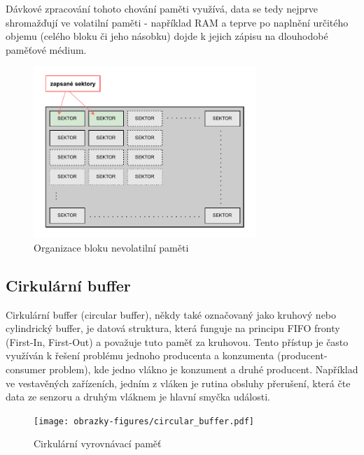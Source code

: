 Dávkové zpracování tohoto chování paměti využívá, data se tedy nejprve shromažďují ve volatilní paměti - například RAM a teprve po naplnění určitého objemu (celého bloku či jeho násobku) dojde k jejich zápisu na dlouhodobé paměťové médium.

\begin{figure}[h]
    \centering
    \includegraphics[width=0.75\textwidth]{obrazky-figures/batch_processing.pdf}
    
    \caption{Organizace bloku nevolatilní paměti \cite{ieee_relationships_among_region_segment_frame_and_cluster}}
    \label{fig:batch-processing}
\end{figure}

\newpage

\subsection{Cirkulární buffer}
\label{cirkularni_buffer}
Cirkulární buffer (circular buffer), někdy také označovaný jako kruhový nebo cylindrický buffer, je datová struktura, která funguje na principu FIFO fronty (First-In, First-Out) a považuje tuto paměť za kruhovou. Tento přístup je často využíván k řešení problému jednoho producenta a konzumenta (producent-consumer problem), kde jedno vlákno je konzument a druhé producent. Například ve vestavěných zařízeních, jedním z vláken je rutina obsluhy přerušení, která čte data ze senzoru a druhým vláknem je hlavní smyčka události. \cite{embedjournal_ring_buffer}


\begin{figure}[h]
    \centering
    \texttt{[image: obrazky-figures/circular\_buffer.pdf]}
    
    \caption{Cirkulární vyrovnávací paměť}
    \label{fig:circular-buffer}
\end{figure}

